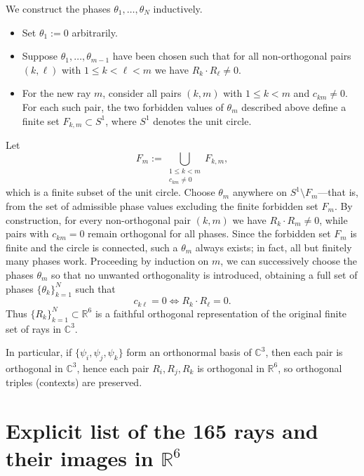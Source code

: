 \documentclass[%
  reprint,
  superscriptaddress,
  amsmath,amssymb,
  pra,
  floatfix,
  longbibliography
]{revtex4-2}
\begin{document}
We construct the phases $\theta_1,\dots,\theta_N$ inductively.

\begin{itemize}
  \item Set $\theta_1:=0$ arbitrarily.
  \item Suppose $\theta_1,\dots,\theta_{m-1}$ have been chosen such that for all non-orthogonal pairs $(k,\ell)$ with $1\le k<\ell<m$ we have $R_k\cdot R_\ell\neq 0$.
  \item For the new ray $m$, consider all pairs $(k,m)$ with $1\le k<m$ and $c_{km}\neq 0$. For each such pair, the two forbidden values of $\theta_m$ described above define a finite set $F_{k,m}\subset S^1$, where $S^1$ denotes the unit circle.
\end{itemize}

Let
\begin{equation}
  F_m := \bigcup_{\substack{1\le k<m \\ c_{km}\neq 0}} F_{k,m},
\end{equation}
which is a finite subset of the unit circle. Choose $\theta_m$ anywhere on $S^1\setminus F_m$---that is, from the set of admissible phase values excluding the finite forbidden set $F_m$.
By construction, for every non-orthogonal pair $(k,m)$ we have $R_k\cdot R_m\neq 0$, while pairs with $c_{km}=0$ remain orthogonal for all phases. Since the forbidden set $F_m$ is finite and the circle is connected, such a $\theta_m$ always exists; in fact, all but finitely many phases work. Proceeding by induction on $m$, we can successively choose the phases $\theta_m$ so that no unwanted orthogonality is introduced, obtaining a full set of phases $\{\theta_k\}_{k=1}^N$ such that
\begin{equation}
  c_{k\ell}=0 \iff R_k\cdot R_\ell=0.
\end{equation}
Thus $\{R_k\}_{k=1}^N\subset\mathbb{R}^6$ is a faithful orthogonal representation of the original finite set of rays in $\mathbb{C}^3$.

In particular, if $\{\psi_{i},\psi_{j},\psi_{k}\}$ form an orthonormal basis of $\mathbb{C}^3$, then each pair is orthogonal in $\mathbb{C}^3$, hence each pair $R_i,R_j,R_k$ is orthogonal in $\mathbb{R}^6$, so orthogonal triples (contexts) are preserved.

\section{Explicit list of the 165 rays and their images in \texorpdfstring{$\mathbb{R}^6$}{R6}}
\label{sec:KSconfig}
\end{document}
